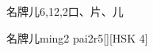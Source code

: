 \begin{entry}{名牌儿}{6,12,2}{⼝、⽚、⼉}
  \begin{phonetics}{名牌儿}{ming2 pai2r5}[][HSK 4]
  \end{phonetics}
\end{entry}
